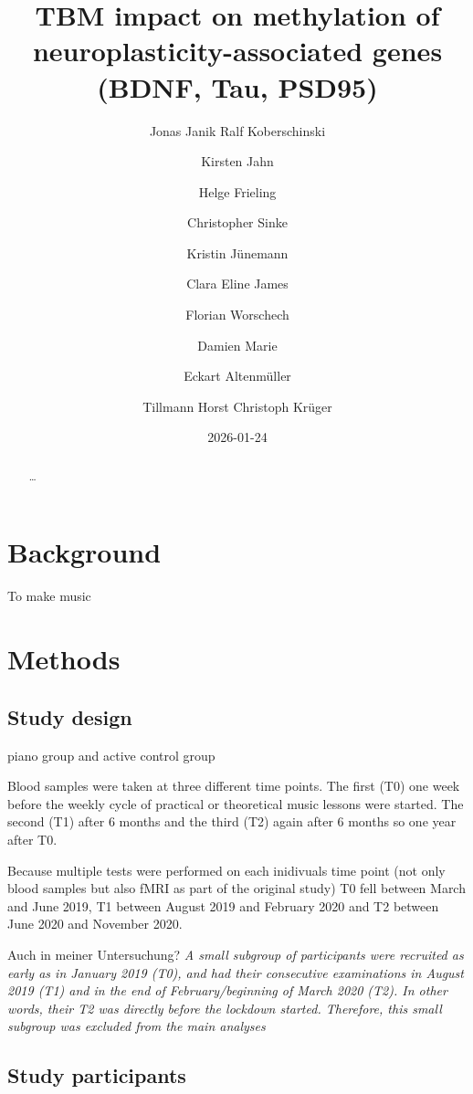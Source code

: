 \documentclass[
  letterpaper,
  DIV=11,
  numbers=noendperiod]{scrartcl}
\title{TBM impact on methylation of neuroplasticity-associated genes
(BDNF, Tau, PSD95)}
\author{Jonas Janik Ralf Koberschinski \and Kirsten Jahn \and Helge
Frieling \and Christopher Sinke \and Kristin Jünemann \and Clara Eline
James \and Florian Worschech \and Damien Marie \and Eckart
Altenmüller \and Tillmann Horst Christoph Krüger}
\date{2026-01-24}
\begin{document}
\maketitle
\begin{abstract}
\ldots{}
\end{abstract}


\section{Background}\label{sec-background}

To make music

\section{Methods}\label{sec-data-methods}

\subsection{Study design}\label{study-design}

piano group and active control group

Blood samples were taken at three different time points. The first (T0)
one week before the weekly cycle of practical or theoretical music
lessons were started. The second (T1) after 6 months and the third (T2)
again after 6 months so one year after T0.

Because multiple tests were performed on each inidivuals time point (not
only blood samples but also fMRI as part of the original study) T0 fell
between March and June 2019, T1 between August 2019 and February 2020
and T2 between June 2020 and November 2020.

Auch in meiner Untersuchung? \emph{A small subgroup of participants were
recruited as early as in January 2019 (T0), and had their consecutive
examinations in August 2019 (T1) and in the end of February/beginning of
March 2020 (T2). In other words, their T2 was directly before the
lockdown started. Therefore, this small subgroup was excluded from the
main analyses}

\subsection{Study participants}\label{study-participants}
\end{document}
